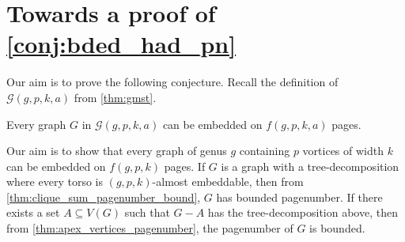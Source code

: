 
\newcommand{\gpk}{12gpk + 12gp + 18g + 12kp + 12p + 11}
\chapter{Towards a proof of \cref{conj:bded_had_pn}}\label{chap:Proving_The_Theorem}
Our aim is to prove the following conjecture. Recall the definition of $\mathcal{G}(g, p, k, a)$ from \cref{thm:gmst}. 
\begin{conjecture}\label{conj:gmst_conjecture_pagenumber}
	Every graph $G$ in $\mathcal{G}(g, p, k, a)$ can be embedded on \(f(g, p, k, a)\) pages.
\end{conjecture}
Our aim is to show that every graph of genus \(g\) containing \(p\) vortices of width \(k\) can be embedded on \(f(g, p, k)\) pages. If $G$ is a graph with a tree-decomposition where every torso is $(g, p, k)$-almost embeddable, then from \cref{thm:clique_sum_pagenumber_bound}, $G$ has bounded pagenumber. If there exists a set $A \subseteq V(G)$ such that $G - A$ has the tree-decomposition above, then from \cref{thm:apex_vertices_pagenumber}, the pagenumber of $G$ is bounded.
















